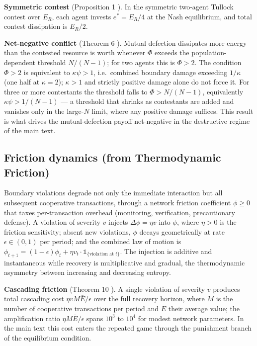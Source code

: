 \documentclass[11pt]{article}
\theoremstyle{plain}
\theoremstyle{definition}
\theoremstyle{remark}
\let\origsubsection\subsection
\renewcommand{\subsection}{\needspace{7\baselineskip}\origsubsection}
\begin{document}
\textbf{Symmetric contest} (Proposition 1 \citep{TC-IV}). In the
symmetric two-agent Tullock contest over \(E_R\), each agent invests
\(e^* = E_R/4\) at the Nash equilibrium, and total contest dissipation
is \(E_R/2\).

\textbf{Net-negative conflict} (Theorem 6 \citep{TC-IV}). Mutual
defection dissipates more energy than the contested resource is worth
whenever \(\Phi\) exceeds the population-dependent threshold
\(N/(N-1)\); for two agents this is \(\Phi > 2\). The condition
\(\Phi > 2\) is equivalent to \(\kappa\psi > 1\), i.e.~combined boundary
damage exceeding \(1/\kappa\) (one half at \(\kappa = 2\));
\(\kappa > 1\) and strictly positive damage alone do not force it. For
three or more contestants the threshold falls to \(\Phi > N/(N-1)\),
equivalently \(\kappa\psi > 1/(N-1)\) --- a threshold that shrinks as
contestants are added and vanishes only in the large-\(N\) limit, where
any positive damage suffices. This result is what drives the
mutual-defection payoff net-negative in the destructive regime of the
main text.

\subsection{Friction dynamics (from Thermodynamic
Friction)}\label{friction-dynamics-from-thermodynamic-friction}

Boundary violations degrade not only the immediate interaction but all
subsequent cooperative transactions, through a network friction
coefficient \(\phi \geq 0\) that taxes per-transaction overhead
(monitoring, verification, precautionary defense). A violation of
severity \(v\) injects \(\Delta\phi = \eta v\) into \(\phi\), where
\(\eta > 0\) is the friction sensitivity; absent new violations,
\(\phi\) decays geometrically at rate \(\epsilon \in (0,1)\) per period;
and the combined law of motion is
\(\phi_{t+1} = (1-\epsilon)\phi_t + \eta v_t \cdot \mathds{1}_{\{\text{violation at } t\}}\).
The injection is additive and instantaneous while recovery is
multiplicative and gradual, the thermodynamic asymmetry between
increasing and decreasing entropy.

\textbf{Cascading friction} (Theorem 10 \citep{TC-IV}). A single
violation of severity \(v\) produces total cascading cost
\(\eta v M \bar{E} / \epsilon\) over the full recovery horizon, where
\(M\) is the number of cooperative transactions per period and
\(\bar{E}\) their average value; the amplification ratio
\(\eta M \bar{E}/\epsilon\) spans \(10^3\) to \(10^4\) for modest
network parameters. In the main text this cost enters the repeated game
through the punishment branch of the equilibrium condition.
\end{document}
